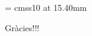 \documentclass[10pt]{beamer}
\begin{document}
\begin{frame}[plain]

  \begin{columns}
    \begin{column}{0.65\textwidth}
      \begin{center}

        \font\endfont = cmss10 at 15.40mm
        
        \endfont 
        \baselineskip 15.0mm

        Gr\`{a}cies!!!

      \end{center}    

    \end{column}
    \begin{column}{0.35\textwidth}
      \begin{center}
      \end{center}
    \end{column}
  \end{columns}

\end{frame}
%
\end{document}
